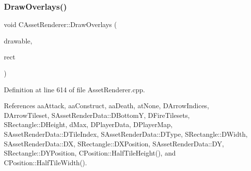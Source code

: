 \subsubsection{\texorpdfstring{Draw\+Overlays()}{DrawOverlays()}}
{\footnotesize\ttfamily void C\+Asset\+Renderer\+::\+Draw\+Overlays (\begin{DoxyParamCaption}\item[{Gdk\+Drawable $\ast$}]{drawable,  }\item[{const \hyperlink{structSRectangle}{S\+Rectangle} \&}]{rect }\end{DoxyParamCaption})}



Definition at line 614 of file Asset\+Renderer.\+cpp.



References aa\+Attack, aa\+Construct, aa\+Death, at\+None, D\+Arrow\+Indices, D\+Arrow\+Tileset, S\+Asset\+Render\+Data\+::\+D\+BottomY, D\+Fire\+Tilesets, S\+Rectangle\+::\+D\+Height, d\+Max, D\+Player\+Data, D\+Player\+Map, S\+Asset\+Render\+Data\+::\+D\+Tile\+Index, S\+Asset\+Render\+Data\+::\+D\+Type, S\+Rectangle\+::\+D\+Width, S\+Asset\+Render\+Data\+::\+DX, S\+Rectangle\+::\+D\+X\+Position, S\+Asset\+Render\+Data\+::\+DY, S\+Rectangle\+::\+D\+Y\+Position, C\+Position\+::\+Half\+Tile\+Height(), and C\+Position\+::\+Half\+Tile\+Width().


